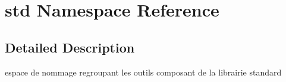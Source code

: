 \hypertarget{namespacestd}{}\section{std Namespace Reference}
\label{namespacestd}


\subsection{Detailed Description}
espace de nommage regroupant les outils composant de la librairie standard 
